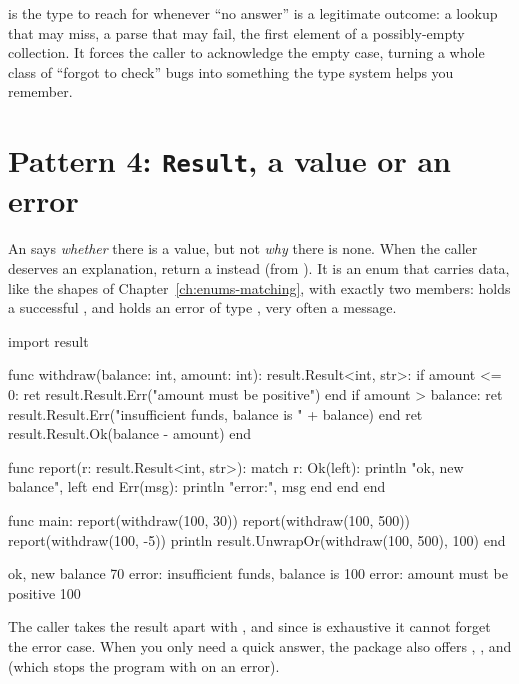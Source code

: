 \begin{note}
 is the type to reach for whenever ``no answer'' is a legitimate
outcome: a lookup that may miss, a parse that may fail, the first element of a
possibly-empty collection. It forces the caller to acknowledge the empty case,
turning a whole class of ``forgot to check'' bugs into something the type system
helps you remember.
\end{note}

\section{Pattern 4: \texttt{Result}, a value or an error}

An  says \emph{whether} there is a value, but not \emph{why} there
is none. When the caller deserves an explanation, return a
 instead (from ). It is an enum
that carries data, like the shapes of Chapter~\ref{ch:enums-matching}, with
exactly two members:  holds a successful , and
 holds an error of type , very often a 
message.

\begin{salamen}
import result

func withdraw(balance: int, amount: int): result.Result<int, str>:
    if amount <= 0:
        ret result.Result.Err("amount must be positive")
    end
    if amount > balance:
        ret result.Result.Err("insufficient funds, balance is " + balance)
    end
    ret result.Result.Ok(balance - amount)
end

func report(r: result.Result<int, str>):
    match r:
        Ok(left): println "ok, new balance", left end
        Err(msg): println "error:", msg end
    end
end

func main:
    report(withdraw(100, 30))
    report(withdraw(100, 500))
    report(withdraw(100, -5))
    println result.UnwrapOr(withdraw(100, 500), 100)
end
\end{salamen}

\begin{progout}
ok, new balance 70
error: insufficient funds, balance is 100
error: amount must be positive
100
\end{progout}

The caller takes the result apart with , and since  is
exhaustive it cannot forget the error case. When you only need a quick answer,
the  package also offers ,
,  and
 (which stops the program with
 on an error).

